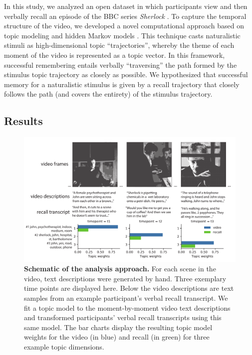 \documentclass{article}
\begin{document}
In this study, we analyzed an open dataset in which participants view and then verbally recall an episode of the BBC series \textit{Sherlock} \citep{ChenEtal17}. To capture the temporal structure of the video, we developed a novel computational approach based on topic modeling \citep{BleiEtal03} and hidden Markov models \citep{Rabi89, BaldEtal17}. This technique casts naturalistic stimuli as high-dimensional topic ``trajectories'', whereby the theme of each moment of the video is represented as a topic vector. In this framework, successful remembering entails verbally ``traversing'' the path formed by the stimulus topic trajectory as closely as possible. We hypothesized that successful memory for a naturalistic stimulus is given by a recall trajectory that closely follows the path (and covers the entirety) of the stimulus trajectory.

\subsection*{Results}

\begin{figure}[th!]
\centering
\includegraphics[width=1\textwidth]{figs/1_analysis_schematic_bw.pdf}
\caption{\small \textbf{Schematic of the analysis approach.} For each scene in the video, text descriptions were generated by hand. Three exemplary time points are displayed here.  Below the video descriptions are text samples from an example participant's verbal recall transcript.  We fit a topic model to the moment-by-moment video text descriptions and transformed participants' verbal recall transcripts using this same model. The bar charts display the resulting topic model weights for the video (in blue) and recall (in green) for three example topic dimensions.}
\label{fig:schematic}
\end{figure}
\end{document}
